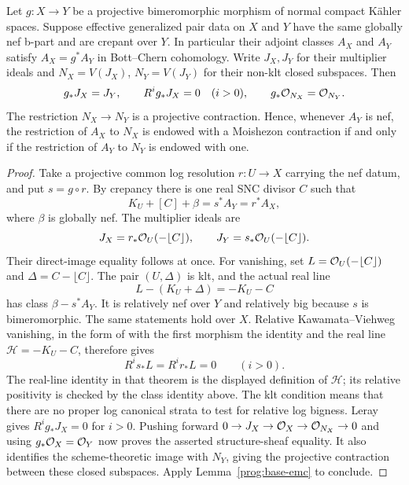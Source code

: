 \begin{lemma}
\label{prog:multiplier-transport}
Let $g:X\to Y$ be a projective bimeromorphic morphism of
normal compact K\"ahler spaces. Suppose effective generalized
pair data on $X$ and $Y$ have the same globally nef b-part
and are crepant over $Y$. In particular their adjoint classes
$A_X$ and $A_Y$ satisfy $A_X=g^*A_Y$ in Bott--Chern
cohomology. Write $J_X,J_Y$ for their multiplier ideals and
$N_X=V(J_X)$, $N_Y=V(J_Y)$ for their non-klt closed
subspaces. Then
\[
       g_*J_X=J_Y,\qquad R^ig_*J_X=0\quad(i>0),
       \qquad g_*\mathcal O_{N_X}=\mathcal O_{N_Y}.
\]
The restriction $N_X\to N_Y$ is a projective contraction.
Hence, whenever $A_Y$ is nef, the restriction of $A_X$ to
$N_X$ is endowed with a Moishezon contraction if and only if
the restriction of $A_Y$ to $N_Y$ is endowed with one.
\end{lemma}

\begin{proof}
Take a projective common log resolution $r:U\to X$ carrying
the nef datum, and put $s=g\circ r$. By crepancy there is
one real SNC divisor $C$ such that
\[
            K_U+[C]+\beta=s^*A_Y=r^*A_X,
\]
where $\beta$ is globally nef. The multiplier ideals are
\[
 J_X=r_*\mathcal O_U(-\lfloor C\rfloor),\qquad
 J_Y=s_*\mathcal O_U(-\lfloor C\rfloor).
\]
Their direct-image equality follows at once. For vanishing, set
$L=\mathcal O_U(-\lfloor C\rfloor)$ and
$\Delta=C-\lfloor C\rfloor$. The pair $(U,\Delta)$
is klt, and the actual real line
\[
                  L-(K_U+\Delta)=-K_U-C
\]
has class $\beta-s^*A_Y$. It is relatively nef over $Y$
and relatively big because $s$ is bimeromorphic. The same
statements hold over $X$. Relative Kawamata--Viehweg vanishing,
in the form of \cite[Theorem~1.2]{FujinoVanishing2025} with
the first morphism the identity and the real line
$\mathcal H=-K_U-C$, therefore gives
\[
 R^is_*L=R^ir_*L=0\qquad(i>0).
\]
The real-line identity in that theorem is the displayed definition
of $\mathcal H$; its relative positivity is checked by the class
identity above. The klt condition means that there are no proper log
canonical strata to test for relative log bigness. Leray gives
$R^ig_*J_X=0$ for $i>0$. Pushing forward
$0\to J_X\to\mathcal O_X\to\mathcal O_{N_X}\to0$ and using
$g_*\mathcal O_X=\mathcal O_Y$ now proves the asserted structure-sheaf
equality. It also identifies the scheme-theoretic image with
$N_Y$, giving the projective contraction between these closed
subspaces. Apply Lemma~\ref{prog:base-emc} to conclude.
\end{proof}

